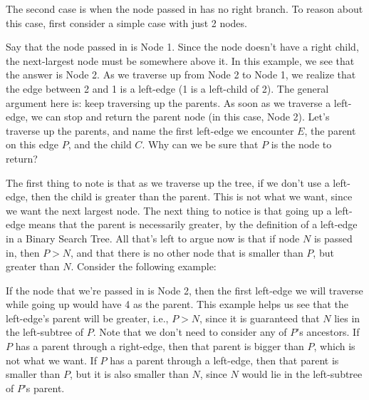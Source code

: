 \begin{blocksection}
\begin{solution}[2.5in]
The second case is when the node passed in has no right branch. To reason about this case, first consider a simple case with just 2 nodes. 

\begin{center}
\end{center}

Say that the node passed in is Node 1. Since the node doesn't have a right child, the next-largest node must be somewhere above it. In this example, we see that the answer is Node 2. As we traverse up from Node 2 to Node 1, we realize that the edge between 2 and 1 is a left-edge (1 is a left-child of 2). The general argument here is: keep traversing up the parents. As soon as we traverse a left-edge, we can stop and return the parent node (in this case, Node 2). Let's traverse up the parents, and name the first left-edge we encounter $E$, the parent on this edge $P$, and the child $C$. Why can we be sure that $P$ is the node to return? 

The first thing to note is that as we traverse up the tree, if we don't use a left-edge, then the child is greater than the parent. This is not what we want, since we want the next largest node. The next thing to notice is that going up a left-edge means that the parent is necessarily greater, by the definition of a left-edge in a Binary Search Tree. All that's left to argue now is that if node $N$ is passed in, then $P>N$, and that there is no other node that is smaller than $P$, but greater than $N$. Consider the following example:

\begin{center}
\end{center}

If the node that we're passed in is Node 2, then the first left-edge we will traverse while going up would have 4 as the parent. This example helps us see that the left-edge's parent will be greater, i.e., $P>N$, since it is guaranteed that $N$ lies in the left-subtree of $P$. Note that we don't need to consider any of $P$'s ancestors. If $P$ has a parent through a right-edge, then that parent is bigger than $P$, which is not what we want. If $P$ has a parent through a left-edge, then that parent is smaller than $P$, but it is also smaller than $N$, since $N$ would lie in the left-subtree of $P$'s parent.  


\end{solution}
\end{blocksection}
